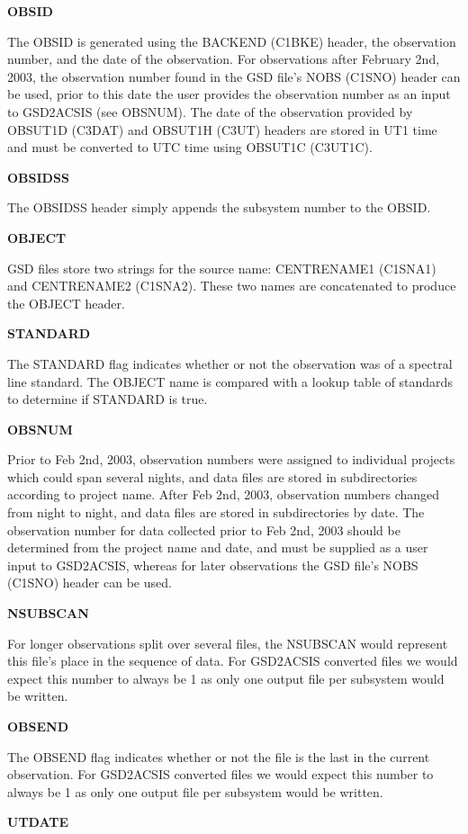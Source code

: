 \documentclass[twoside,11pt]{article}
\renewcommand{\_}{\texttt{\symbol{95}}}
\newcommand{\objectA}{CENTRE\_NAME\_1 (C1SNA1)}
\newcommand{\objectB}{CENTRE\_NAME\_2 (C1SNA2)}
\newcommand{\nObs}{NOBS (C1SNO)}
\newcommand{\backend}{BACKEND (C1BKE)}
\newcommand{\obsUTd}{OBS\_UT1D (C3DAT)}
\newcommand{\obsUTh}{OBS\_UT1H (C3UT)}
\newcommand{\obsUTC}{OBS\_UT1C (C3UT1C)}
\newcommand{\objectA}{CENTRE\_NAME\_1 (C1SNA1)\ref{GSDVars:objectA}}
\newcommand{\objectB}{CENTRE\_NAME\_2 (C1SNA2)\ref{GSDVars:objectB}}
\newcommand{\nObs}{NOBS (C1SNO)\ref{GSDVars:nObs}}
\newcommand{\backend}{BACKEND (C1BKE)\ref{GSDVars:backend}}
\newcommand{\obsUTd}{OBS\_UT1D (C3DAT)\ref{GSDVars:obsUTd}}
\newcommand{\obsUTh}{OBS\_UT1H (C3UT)\ref{GSDVars:obsUTh}}
\newcommand{\obsUTC}{OBS\_UT1C (C3UT1C)\ref{GSDVars:obsUTC}}
\begin{document}
{\bf OBSID}

The OBSID is generated using the \backend{} header, the observation number, and the date of the observation.  For observations after February 2nd, 2003, the observation number found in the GSD file's \nObs{} header can be used, prior to this date the user provides the observation number as an input to GSD2ACSIS (see OBSNUM).  The date of the observation provided by \obsUTd{} and \obsUTh{} headers are stored in UT1 time and must be converted to UTC time using \obsUTC.

{\bf OBSIDSS}

The OBSIDSS header simply appends the subsystem number to the OBSID.

{\bf OBJECT}

GSD files store two strings for the source name: \objectA{} and \objectB.  These two names are concatenated to produce the OBJECT header.

{\bf STANDARD}

The STANDARD flag indicates whether or not the observation was of a spectral line standard.  The OBJECT name is compared with a lookup table of standards to determine if STANDARD is true.

{\bf OBSNUM}

Prior to Feb 2nd, 2003, observation numbers were assigned to individual projects which could span several nights, and data files are stored in subdirectories according to project name.  After Feb 2nd, 2003, observation numbers changed from night to night, and data files are stored in subdirectories by date.  The observation number for data collected prior to Feb 2nd, 2003 should be determined from the project name and date, and must be supplied as a user input to GSD2ACSIS, whereas for later observations the GSD file's \nObs{} header can be used.

{\bf NSUBSCAN}

For longer observations split over several files, the NSUBSCAN would represent this file's place in the sequence of data.  For GSD2ACSIS converted files we would expect this number to always be 1 as only one output file per subsystem would be written.

{\bf OBSEND}

The OBSEND flag indicates whether or not the file is the last in the current observation.  For GSD2ACSIS converted files we would expect this number to always be 1 as only one output file per subsystem would be written.

{\bf UTDATE}
\end{document}
